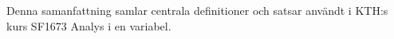 Denna samanfattning samlar centrala definitioner och satsar användt i KTH:s kurs SF1673 Analys i en variabel.